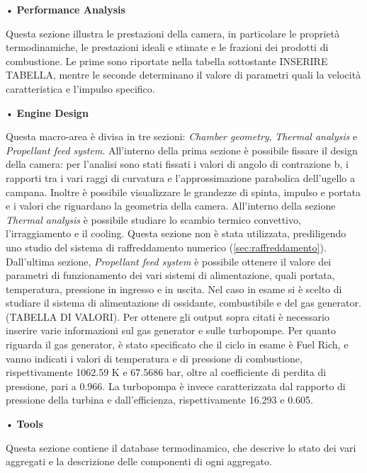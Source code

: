• \textbf{Performance Analysis}

Questa sezione illustra le prestazioni della camera, in particolare le proprietà termodinamiche, le prestazioni ideali e stimate e le frazioni dei prodotti di combustione. Le prime sono riportate nella tabella sottostante INSERIRE TABELLA, mentre le seconde determinano il valore di parametri quali la velocità caratteristica e l'impulso specifico. 

• \textbf{Engine Design}

Questa macro-area è divisa in tre sezioni: \textit{Chamber geometry}, \textit{Thermal analysis} e \textit{Propellant feed system}.
All'interno della prima sezione è possibile fissare il design della camera: per l'analisi sono stati fissati i valori di angolo di contrazione b, i rapporti tra i vari raggi di curvatura e l'approssimazione parabolica dell'ugello a campana. Inoltre è possibile visualizzare le grandezze di spinta, impulso e portata e i valori che riguardano la geometria della camera.
All'interno della sezione \textit{Thermal analysis} è possibile studiare lo scambio termico convettivo, l'irraggiamento e il cooling. Questa sezione non è stata utilizzata, prediligendo uno studio del sistema di raffreddamento numerico (\autoref{sec:raffreddamento}).
Dall'ultima sezione, \textit{Propellant feed system} è possibile ottenere il valore dei parametri di funzionamento dei vari sistemi di alimentazione, quali portata, temperatura, pressione in ingresso e in uscita. Nel caso in esame si è scelto di studiare il sistema di alimentazione di ossidante, combustibile e del gas generator. (TABELLA DI VALORI). Per ottenere gli output sopra citati è necessario inserire varie informazioni sul gas generator e sulle turbopompe. Per quanto riguarda il gas generator, è stato specificato che il ciclo in esame è Fuel Rich, e vanno indicati i valori di temperatura e di pressione di combustione, rispettivamente 1062.59 K e 67.5686 bar, oltre al coefficiente di perdita di pressione, pari a 0.966. La turbopompa è invece caratterizzata dal rapporto di pressione della turbina e dall'efficienza, rispettivamente 16.293 e 0.605. 

• \textbf{Tools}

Questa sezione contiene il database termodinamico, che descrive lo stato dei vari aggregati e la descrizione delle componenti di ogni aggregato.

